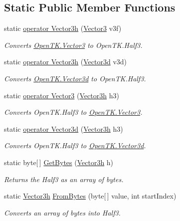 \subsection*{Static Public Member Functions}
\begin{DoxyCompactItemize}
\item 
static \hyperlink{struct_open_t_k_1_1_vector3h_a98974a459f253073adf001a8b4db6dbb}{operator Vector3h} (\hyperlink{struct_open_t_k_1_1_vector3}{Vector3} v3f)
\begin{DoxyCompactList}\small\item\em Converts \hyperlink{struct_open_t_k_1_1_vector3}{Open\-T\-K.\-Vector3} to Open\-T\-K.\-Half3.\end{DoxyCompactList}\item 
static \hyperlink{struct_open_t_k_1_1_vector3h_ae63d88f20bd02dea8bebd7cadc9cf04d}{operator Vector3h} (\hyperlink{struct_open_t_k_1_1_vector3d}{Vector3d} v3d)
\begin{DoxyCompactList}\small\item\em Converts \hyperlink{struct_open_t_k_1_1_vector3d}{Open\-T\-K.\-Vector3d} to Open\-T\-K.\-Half3.\end{DoxyCompactList}\item 
static \hyperlink{struct_open_t_k_1_1_vector3h_a1f3b688ab2eb192a25164c4c3a689c57}{operator Vector3} (\hyperlink{struct_open_t_k_1_1_vector3h}{Vector3h} h3)
\begin{DoxyCompactList}\small\item\em Converts Open\-T\-K.\-Half3 to \hyperlink{struct_open_t_k_1_1_vector3}{Open\-T\-K.\-Vector3}.\end{DoxyCompactList}\item 
static \hyperlink{struct_open_t_k_1_1_vector3h_a87b14a3e54fe059e7fb19cacd50d3d6c}{operator Vector3d} (\hyperlink{struct_open_t_k_1_1_vector3h}{Vector3h} h3)
\begin{DoxyCompactList}\small\item\em Converts Open\-T\-K.\-Half3 to \hyperlink{struct_open_t_k_1_1_vector3d}{Open\-T\-K.\-Vector3d}.\end{DoxyCompactList}\item 
static byte\mbox{[}$\,$\mbox{]} \hyperlink{struct_open_t_k_1_1_vector3h_ae352fdd97ce57eb75d4d4f4096623367}{Get\-Bytes} (\hyperlink{struct_open_t_k_1_1_vector3h}{Vector3h} h)
\begin{DoxyCompactList}\small\item\em Returns the Half3 as an array of bytes.\end{DoxyCompactList}\item 
static \hyperlink{struct_open_t_k_1_1_vector3h}{Vector3h} \hyperlink{struct_open_t_k_1_1_vector3h_a3931628ea48de761a96de6a2afd108ae}{From\-Bytes} (byte\mbox{[}$\,$\mbox{]} value, int start\-Index)
\begin{DoxyCompactList}\small\item\em Converts an array of bytes into Half3.\end{DoxyCompactList}\end{DoxyCompactItemize}
